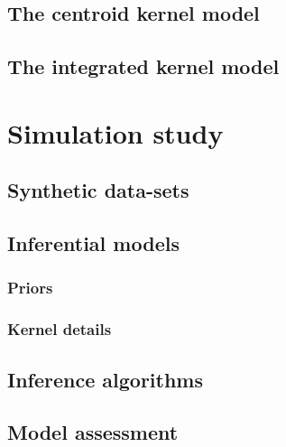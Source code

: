 \documentclass[a4paper, nobind]{templates/ociamthesis}
\begin{document}
\hypertarget{the-centroid-kernel-model}{%
\subsection{The centroid kernel model}\label{the-centroid-kernel-model}}

\hypertarget{the-integrated-kernel-model}{%
\subsection{The integrated kernel model}\label{the-integrated-kernel-model}}

\hypertarget{simulation-study}{%
\section{Simulation study}\label{simulation-study}}

\hypertarget{synthetic-data-sets}{%
\subsection{Synthetic data-sets}\label{synthetic-data-sets}}

\hypertarget{inferential-models}{%
\subsection{Inferential models}\label{inferential-models}}

\hypertarget{priors}{%
\subsubsection{Priors}\label{priors}}

\hypertarget{kernel-details}{%
\subsubsection{Kernel details}\label{kernel-details}}

\hypertarget{inference-algorithms}{%
\subsection{Inference algorithms}\label{inference-algorithms}}

\hypertarget{model-assessment}{%
\subsection{Model assessment}\label{model-assessment}}
\end{document}
